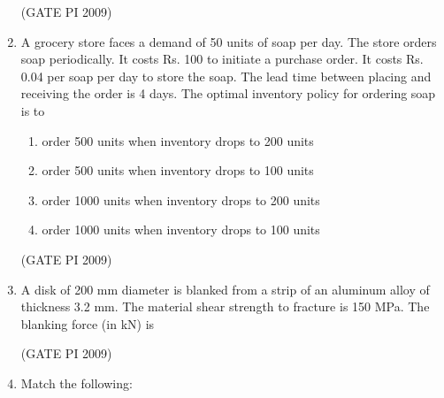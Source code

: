 \documentclass[journal,12pt,onecolumn]{IEEEtran}
\theoremstyle{remark}
\begin{document}
\begin{enumerate}
\begin{enumerate}
\end{enumerate}

\hfill (GATE PI 2009)
\item A grocery store faces a demand of 50 units of soap per day. The store orders soap periodically. It costs Rs. 100 to initiate a purchase order. It costs Rs. 0.04 per soap per day to store the soap. The lead time between placing and receiving the order is 4 days. The optimal inventory policy for ordering soap is to
\begin{enumerate}
\item order 500 units when inventory drops to 200 units 
\item order 500 units when inventory drops to 100 units
\item order 1000 units when inventory drops to 200 units
\item order 1000 units when inventory drops to 100 units
\end{enumerate}
\hfill (GATE PI 2009)
\item A disk of 200 mm diameter is blanked from a strip of an aluminum alloy of thickness 3.2 mm. The material shear strength to fracture is 150 MPa. The blanking force (in kN) is

\begin{enumerate}
\end{enumerate}

\hfill (GATE PI 2009)

\item Match the following:


\end{enumerate}
\end{document}
